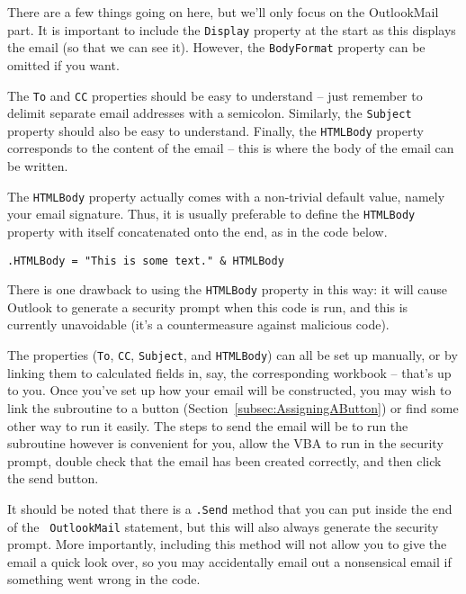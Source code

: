 \documentclass[11pt]{article}%
\begin{document}
There are a few things going on here, but we'll only focus on the OutlookMail part. It is important to include the \texttt{Display} property at the start as this displays the email (so that we can see it). However, the \texttt{BodyFormat} property can be omitted if you want.

The \texttt{To} and \texttt{CC} properties should be easy to understand -- just remember to delimit separate email addresses with a semicolon. Similarly, the \texttt{Subject} property should also be easy to understand. Finally, the \texttt{HTMLBody} property corresponds to the content of the email -- this is where the body of the email can be written.

The \texttt{HTMLBody} property actually comes with a non-trivial default value, namely your email signature. Thus, it is usually preferable to define the \texttt{HTMLBody} property with itself concatenated onto the end, as in the code below.\\

\begin{lstlisting}[style=A]
    .HTMLBody = "This is some text." & HTMLBody
\end{lstlisting}

There is one drawback to using the \texttt{HTMLBody} property in this way: it will cause Outlook to generate a security prompt when this code is run, and this is currently unavoidable (it's a countermeasure against malicious code).

The properties (\texttt{To}, \texttt{CC}, \texttt{Subject}, and \texttt{HTMLBody}) can all be set up manually, or by linking them to calculated fields in, say, the corresponding workbook -- that's up to you. Once you've set up how your email will be constructed, you may wish to link the subroutine to a button (Section~\ref{subsec:AssigningAButton}) or find some other way to run it easily. The steps to send the email will be to run the subroutine however is convenient for you, allow the VBA to run in the security prompt, double check that the email has been created correctly, and then click the send button.

It should be noted that there is a \texttt{.Send} method that you can put inside the end of the \texttt{ OutlookMail} statement, but this will also always generate the security prompt. More importantly, including this method will not allow you to give the email a quick look over, so you may accidentally email out a nonsensical email if something went wrong in the code.
\end{document}
